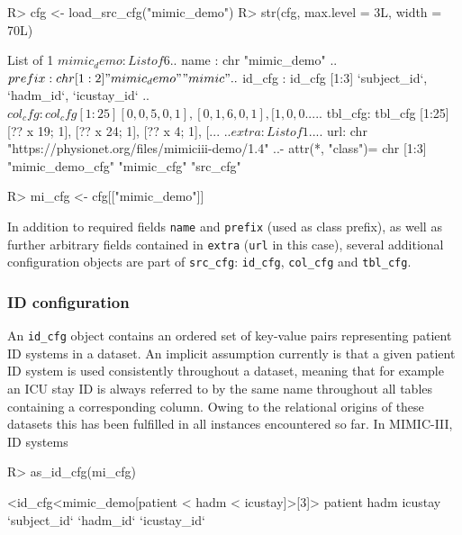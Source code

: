 \documentclass[
  notitle]{jss}
\begin{document}
\begin{CodeChunk}
\begin{CodeInput}
R> cfg <- load_src_cfg("mimic_demo")
R> str(cfg, max.level = 3L, width = 70L)
\end{CodeInput}
\begin{CodeOutput}
List of 1
 $ mimic_demo:List of 6
  ..$ name   : chr "mimic_demo"
  ..$ prefix : chr [1:2] "mimic_demo" "mimic"
  ..$ id_cfg : id_cfg [1:3] `subject_id`, `hadm_id`, `icustay_id`
  ..$ col_cfg: col_cfg [1:25] [0, 0, 5, 0, 1], [0, 1, 6, 0, 1], [1, 0, 0...
  ..$ tbl_cfg: tbl_cfg [1:25] [?? x 19; 1], [?? x 24; 1], [?? x 4; 1], [...
  ..$ extra  :List of 1
  .. ..$ url: chr "https://physionet.org/files/mimiciii-demo/1.4"
  ..- attr(*, "class")= chr [1:3] "mimic_demo_cfg" "mimic_cfg" "src_cfg"
\end{CodeOutput}
\begin{CodeInput}
R> mi_cfg <- cfg[["mimic_demo"]]
\end{CodeInput}
\end{CodeChunk}

In addition to required fields \texttt{name} and \texttt{prefix} (used
as class prefix), as well as further arbitrary fields contained in
\texttt{extra} (\texttt{url} in this case), several additional
configuration objects are part of \texttt{src\_cfg}: \texttt{id\_cfg},
\texttt{col\_cfg} and \texttt{tbl\_cfg}.

\hypertarget{id-configuration}{%
\subsubsection{ID configuration}\label{id-configuration}}

An \texttt{id\_cfg} object contains an ordered set of key-value pairs
representing patient ID systems in a dataset. An implicit assumption
currently is that a given patient ID system is used consistently
throughout a dataset, meaning that for example an ICU stay ID is always
referred to by the same name throughout all tables containing a
corresponding column. Owing to the relational origins of these datasets
this has been fulfilled in all instances encountered so far. In
MIMIC-III, ID systems

\begin{CodeChunk}
\begin{CodeInput}
R> as_id_cfg(mi_cfg)
\end{CodeInput}
\begin{CodeOutput}
<id_cfg<mimic_demo[patient < hadm < icustay]>[3]>
     patient         hadm      icustay 
`subject_id`    `hadm_id` `icustay_id` 
\end{CodeOutput}
\end{CodeChunk}
\end{document}
